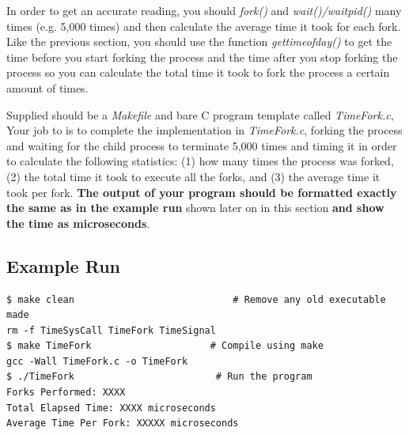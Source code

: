 \documentclass{article}
\begin{document}
In order to get an accurate reading, you should \textit{fork()} and \textit{wait()/waitpid()} many times (e.g. 5,000 times) and then calculate the average time it took for each fork. Like the previous section, you should use the function \textit{gettimeofday()} to get the time before you start forking the process and the time after you stop forking the process so you can calculate the total time it took to fork the process a certain amount of times.  

Supplied should be a \textit{Makefile} and bare C program template called \textit{TimeFork.c}, Your job to is to complete the implementation in \textit{TimeFork.c}, forking the process and waiting for the child process to terminate 5,000 times and timing it in order to calculate the following statistics: (1) how many times the process was forked, (2) the total time it took to execute all the forks, and (3) the average time it took per fork. \textbf{The output of your program should be formatted exactly the same as in the example run} shown later on in this section \textbf{and show the time as microseconds}.

\subsection*{Example Run}
\begin{commandline}
	\begin{verbatim}
$ make clean                            # Remove any old executable made
rm -f TimeSysCall TimeFork TimeSignal 
$ make TimeFork                     # Compile using make
gcc -Wall TimeFork.c -o TimeFork
$ ./TimeFork                         # Run the program
Forks Performed: XXXX
Total Elapsed Time: XXXX microseconds
Average Time Per Fork: XXXXX microseconds
	\end{verbatim}
\end{commandline}
\end{document}
